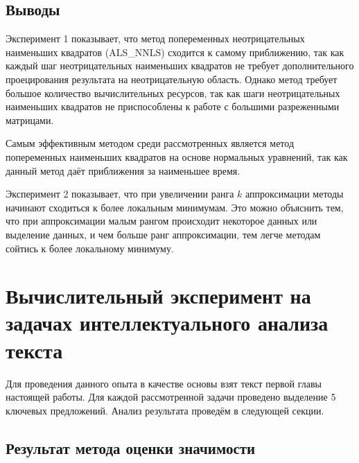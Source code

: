 \newpage

\subsection{Выводы}

Эксперимент 1 показывает, что метод попеременных неотрицательных наименьших квадратов (ALS\_NNLS)
сходится к самому  приближению, так как каждый шаг неотрицательных наименьших квадратов
не требует дополнительного проецирования результата на неотрицательную область.
Однако метод требует большое количество вычислительных ресурсов, так как шаги неотрицательных наименьших квадратов
не приспособлены к работе с большими разреженными матрицами.

Самым эффективным методом среди рассмотренных является метод попеременных наименьших квадратов на основе нормальных уравнений,
так как данный метод даёт  приближения за наименьшее время.

Эксперимент 2 показывает, что при увеличении ранга $k$ аппроксимации методы начинают сходиться к более  локальным минимумам.
Это можно объяснить тем, что при аппроксимации малым рангом происходит некоторое  данных или выделение  данных, и чем больше ранг аппроксимации,
тем легче методам сойтись к более  локальному минимуму.

\newpage





\section{Вычислительный эксперимент на задачах интеллектуального анализа текста}

Для проведения данного опыта в качестве основы взят текст первой главы настоящей работы.
Для каждой рассмотренной задачи проведено выделение 5 ключевых предложений.
Анализ результата проведём в следующей секции.


\subsection{Результат метода оценки значимости}

